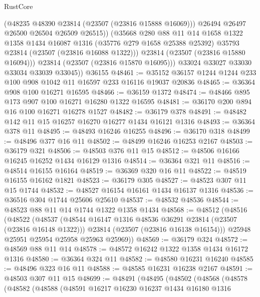 \begin{lexlean}{RustCore}
\begin{coremodule}
                (@48235 @48390 @23814 (@23507 (@23816 @15888 @16069)))
                @26494
                @26497
                @26500
                @26504
                @26509
                @26515))
            (@35668
              @280
              @88
              @11
              @14
              @1658
              @1322
              @1358
              @1434
              @16087
              @1316
              (@35776 @279 @1658 @25388 @25392)
              @35793
              @23814
              (@23507 (@23816 @16088 @1322)))
            @23814
            (@23507 (@23816 @15880 @16094)))
          @23814
          (@23507 (@23816 @15870 @16095)))
        @33024
        @33027
        @33030
        @33034
        @33039
        @33045))
    @36155
@48461 := @35152 @36157 @1244 @1244 @233 @100 @908 @1042 @11 @16597 @233 @16116 @19037 @20836
@48465 := @36364 @908 @100 @16271 @16595
@48466 := @36159 @1372
@48474 := @48466 @895 @173 @907 @100 @16271 @16280 @1322 @16595
@48481 := @36170 @200 @894 @16 @100 @16271 @16278 @1527
@48482 := @36179 @378
@48491 := @48482 @142 @11 @15 @16257 @16270 @16277 @1434 @16121 @1316
@48493 := @36364 @378 @11
@48495 := @48493 @16246 @16255
@48496 := @36170 @318
@48499 := @48496 @377 @16 @11
@48502 := @48499 @16246 @16253 @2167
@48503 := @36179 @321
@48506 := @48503 @376 @11 @15
@48512 := @48506 @16166 @16245 @16252 @1434 @16129 @1316
@48514 := @36364 @321 @11
@48516 := @48514 @16155 @16164
@48519 := @36369 @320 @16 @11
@48522 := @48519 @16155 @16162 @1821
@48523 := @36179 @305
@48527 := @48523 @307 @11 @15 @1744
@48532 := @48527 @16154 @16161 @1434 @16137 @1316
@48536 := @36516 @304 @1744 @25606 @25610
@48537 := @48532 @48536
@48544 := @48523 @88 @11 @14 @1744 @1322 @1358 @1434
@48568 := @48512
    (@48516
      (@48522
        (@48537
          (@48544 @16147 @1316 @48536 @36291 @23814 (@23507 (@23816 @16148 @1322)))
          @23814
          (@23507 (@23816 @16138 @16154)))
        @25948
        @25951
        @25954
        @25958
        @25963
        @25969))
@48569 := @36179 @324
@48572 := @48569 @88 @11 @14
@48578 := @48572 @16242 @1322 @1358 @1434 @16172 @1316
@48580 := @36364 @324 @11
@48582 := @48580 @16231 @16240
@48585 := @48496 @323 @16 @11
@48588 := @48585 @16231 @16238 @2167
@48591 := @48503 @307 @11 @15
@48699 := @48491
    (@48495
      (@48502
        (@48568
          (@48578
            (@48582
              (@48588
                (@48591
                  @16217
                  @16230
                  @16237
                  @1434
                  @16180
                  @1316

\end{coremodule}
\end{lexlean}
